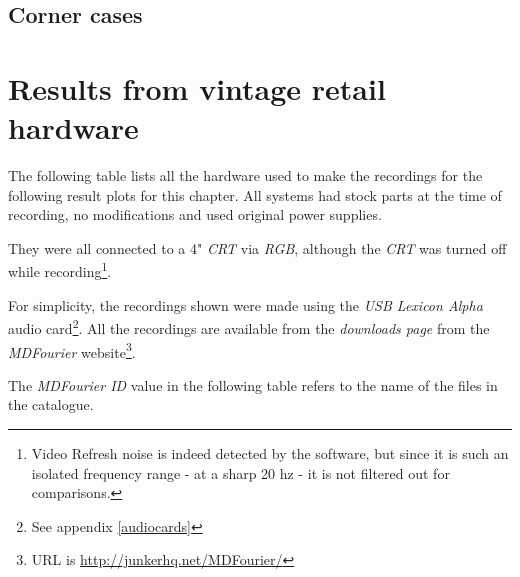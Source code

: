 \documentclass[10pt,a4paper]{report}
\begin{document}
\section{Corner cases}
\label{cornercase}

\chapter{Results from vintage retail hardware}

The following table lists all the hardware used to make the recordings for the following result plots for this chapter. All systems had stock parts at the time of recording, no modifications and used original power supplies. 

They were all connected to a 4" \textit{CRT} via \textit{RGB}, although the \textit{CRT} was turned off while recording\footnote{Video Refresh noise is indeed detected by the software, but since it is such an isolated frequency range - at a sharp 20 hz - it is not filtered out for comparisons.}.

For simplicity, the recordings shown were made using the \textit{USB Lexicon Alpha} audio card\footnote{See appendix \ref{audiocards}}. All the recordings are available from the \textit{downloads page} from the \textit{MDFourier} website\footnote{URL is \url{http://junkerhq.net/MDFourier/}}.

The \textit{MDFourier ID} value in the following table refers to the name of the files in the catalogue.
\end{document}
